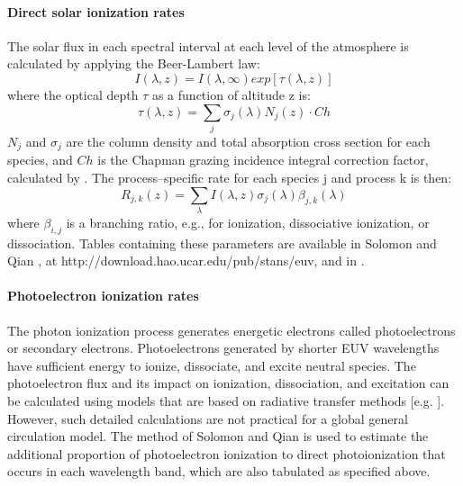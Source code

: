 \paragraph{Direct solar ionization rates}
The solar flux in each spectral interval at each level of the atmosphere is 
calculated by applying the Beer-Lambert law:
%        
\begin{equation}
   I(\lambda,z) = I(\lambda,\infty) exp[\tau(\lambda,z)]
\end{equation}
%	
where the optical depth $\tau$ as a function of altitude z is:
%        
\begin{equation}
   \tau(\lambda,z)=\sum_j \sigma_j(\lambda)N_j(z) \cdot Ch
\end{equation}
%		
$N_j$ and $\sigma_j$ are the column density and total absorption cross 
section for each species, and $Ch$ is the Chapman grazing incidence 
integral correction factor, calculated by .  The 
process--specific rate for each species j and process k is then:
%        
\begin{equation}
   R_{j,k}(z)=\sum_{\lambda} I(\lambda,z)\sigma_j(\lambda)\beta_{j,k}(\lambda)
\end{equation}
%	
where $\beta_{i,j}$ is a branching ratio, e.g., for ionization, 
dissociative ionization, or dissociation.  Tables containing these 
parameters are available in Solomon and Qian \cite{Solomon2005}, at 
http://download.hao.ucar.edu/pub/stans/euv, and in . \\

%
\paragraph{Photoelectron ionization rates} 
The photon ionization process generates energetic electrons called 
photoelectrons or secondary electrons. Photoelectrons generated by 
shorter EUV wavelengths have sufficient energy to ionize, dissociate, 
and excite neutral species. The photoelectron flux and its impact on 
ionization, dissociation, and excitation can be calculated using models 
that are based on radiative transfer methods [e.g. \cite{Nagy1970} 
\cite{Solomon1988}]. However, such detailed calculations are not 
practical for a global general circulation model. The method of 
Solomon and Qian \cite{Solomon2005} is used to estimate the additional proportion 
of photoelectron ionization to direct photoionization that occurs in 
each wavelength band, which are also tabulated as specified above.  

